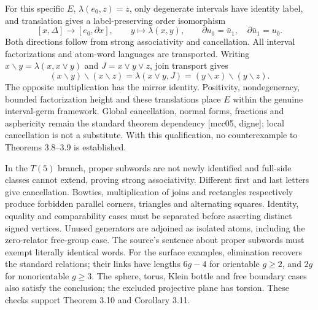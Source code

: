\documentclass[10pt]{article}
\begin{document}
For this specific \(E\), \(\lambda(e_0,z)=z\), only degenerate intervals have identity label, and translation gives a label-preserving order isomorphism \[[x,\Delta]\longrightarrow[e_0,\partial x],\qquad
 y\mapsto\lambda(x,y),\qquad
 \partial u_0=\bar u_1,\quad\partial\bar u_1=u_0.\] Both directions follow from strong associativity and cancellation. All interval factorizations and atom-word languages are transported. Writing \(x\backslash y=\lambda(x,x\vee y)\) and \(J=x\vee y\vee z\), join transport gives \[(x\backslash y)\backslash(x\backslash z)
 =\lambda(x\vee y,J)
 =(y\backslash x)\backslash(y\backslash z).\] The opposite multiplication has the mirror identity. Positivity, nondegeneracy, bounded factorization height and these translations place \(E\) within the genuine interval-germ framework. Global cancellation, normal forms, fractions and asphericity remain the standard theorem dependency [mcc05, digne]; local cancellation is not a substitute. With this qualification, no counterexample to Theorems 3.8–3.9 is established.\par
In the \(T(5)\) branch, proper subwords are not newly identified and full-side classes cannot extend, proving strong associativity. Different first and last letters give cancellation. Bowties, multiplication of joins and rectangles respectively produce forbidden parallel corners, triangles and alternating squares. Identity, equality and comparability cases must be separated before asserting distinct signed vertices. Unused generators are adjoined as isolated atoms, including the zero-relator free-group case. The source’s sentence about proper subwords must exempt literally identical words. For the surface examples, elimination recovers the standard relations; their links have lengths \(6g-4\) for orientable \(g\ge2\), and \(2g\) for nonorientable \(g\ge3\). The sphere, torus, Klein bottle and free boundary cases also satisfy the conclusion; the excluded projective plane has torsion. These checks support Theorem 3.10 and Corollary 3.11.\par
\end{document}
